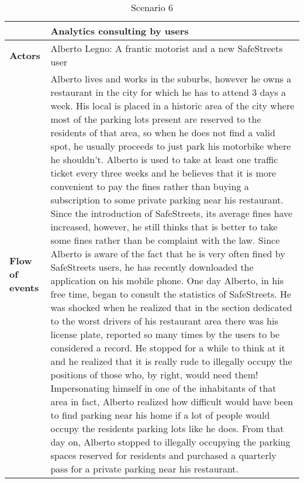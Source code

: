 \begin{table}[!htbp]
	\centering
\begin{tabular}{lp{9.8cm}}
\hline
\bf\large  &\bf\large Analytics consulting by users\\
\hline
\hline

\bf Actors&Alberto Legno: A frantic motorist and a new SafeStreets user\\
\hline
\bf Flow of events&
Alberto lives and works in the suburbs, however he owns a restaurant in the city for which he has to attend 3 days a week.
His local is placed in a historic area of the city where most of the parking lots present are reserved to the residents of that area, so when he does not find a valid spot, he usually proceeds to just park his motorbike where he shouldn't.
Alberto is used to take at least one traffic ticket every three weeks and he believes that it is more convenient to pay the fines rather than buying a subscription to some private parking near his restaurant.
Since the introduction of SafeStreets, its average fines have increased, however, he still thinks that is better to take some fines rather than be complaint with the law.
Since Alberto is aware of the fact that he is very often fined by SafeStreets users, he has recently downloaded the application on his mobile phone. One day Alberto, in his free time, began to consult the statistics of SafeStreets. He was shocked when he realized that in the section dedicated to the worst drivers of his restaurant area there was his license plate, reported so many times by the users to be considered a record.
He stopped for a while to think at it and he realized that it is really rude to illegally occupy the positions of those who, by right, would need them! Impersonating himself in one of the inhabitants of that area in fact, Alberto realized how difficult would have been to find parking near his home if a lot of people would occupy the residents parking lots like he does.
From that day on, Alberto stopped to illegally occupying the parking spaces reserved for residents and purchased a quarterly pass for a private parking near his restaurant.
\end{tabular}
\caption{Scenario 6} 
\label{tab:scenariosix}
\end{table}